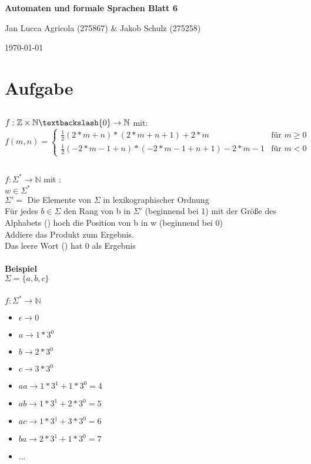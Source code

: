 \documentclass[a4paper,12pt,titlepage]{article}
\begin{document}
\begin{titlepage}
    \centering
    \vspace*{2cm}
    {\LARGE\bfseries Automaten und formale Sprachen Blatt 6\par}
    \vspace{2cm}
    {\Large Jan Lucca Agricola (275867) \& Jakob Schulz (275258)\par}
    \vspace{2cm}
    {\large\today\par}
\end{titlepage}

\section{Aufgabe}
\subsection{}
$f: \mathbb{Z} \times \mathbb{N}\textbackslash\{0\} \rightarrow \mathbb{N}$ mit: \\
$$f(m,n) =\left\{ \begin{array}{ll}\frac{1}{2}(2*m+n)\ast(2*m+n+1) + 2*m & \text{für } m \geq 0\\ \frac{1}{2}(-2*m-1+n)\ast(-2*m-1+n+1) -2*m-1 & \text{für } m < 0\end{array} \right.$$
\subsection{}
$f: \Sigma^* \rightarrow \mathbb{N}$ mit :\\
$w \in \Sigma^*$\\
$\Sigma' =$ Die Elemente von $\Sigma$ in lexikographischer Ordnung\\
Für jedes $b \in \Sigma$ den Rang von b in $\Sigma'$ (beginnend bei 1) mit  der Größe des Alphabets (\Sigma) hoch die Position von b in w (beginnend bei 0)\\
Addiere das Produkt zum Ergebnis.\\
Das leere Wort (\epsilon) hat 0 als Ergebnis\\
\\
\textbf{Beispiel}\\
$\Sigma = \{a, b, c\}$\\
\\
$f: \Sigma^* \rightarrow \mathbb{N}$\\
\begin{itemize}
\item $\epsilon \rightarrow 0$
\item $a \rightarrow 1*3^0$
\item $b \rightarrow 2*3^0$
\item $c \rightarrow 3*3^0$
\item $aa \rightarrow 1*3^1+1*3^0 = 4$
\item $ab \rightarrow 1*3^1+2*3^0 = 5$
\item $ac \rightarrow 1*3^1+3*3^0 = 6$
\item $ba \rightarrow 2*3^1+1*3^0 = 7$
\item ...
\end{itemize}
\end{document}
